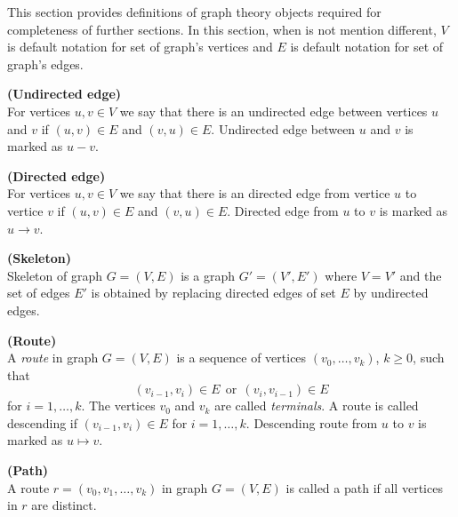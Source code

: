 %
%


This section provides definitions of graph theory objects required for completeness of further sections.
In this section, when is not mention different, $V$ is default notation for set of graph's vertices and 
$E$ is default notation for set of graph's edges. 


\begin{defi}{\textbf{(Undirected edge)}} \\
	For vertices $u, v \in V$ we say that there is an undirected edge between vertices $u$ 
	and $v$ if $(u, v) \in E$ and $(v, u) \in E$. Undirected edge between $u$ and $v$ is marked as $u-v$.
\end{defi}


\begin{defi} {\textbf{(Directed edge)}} \\
	For vertices $u, v \in V$ we say that there is an directed edge from vertice $u$ to vertice $v$ if
	$(u, v) \in E$ and $(v, u) \in E$. Directed edge from $u$ to $v$ is marked as $u \rightarrow v$.
\end{defi}


\begin{defi} {\textbf{(Skeleton)}} \\
	Skeleton of graph $G = (V, E)$ is a graph $G' = (V', E')$ where $V = V'$ and the set of edges $E'$
	is obtained by replacing directed edges of set $E$ by undirected edges.
\end{defi}


\begin{defi} {\textbf{(Route)}} \\
	A \textit{route} in graph $G = (V, E)$ is a sequence of vertices $(v_0, \dots, v_k)$, $k \ge 0$, such that 
	$$ (v_{i-1}, v_i) \in E \ \  \mbox{or} \ \ (v_i, v_{i-1}) \in E$$
	for $i = 1, \dots, k$. The vertices $v_0$ and $v_k$ are called \textit{terminals}. A route is called descending
	if $(v_{i-1}, v_i) \in E$ for $i = 1, \dots, k$. Descending route from $u$ to $v$ is marked as $u \mapsto v$. 
\end{defi}


\begin{defi} {\textbf{(Path)}} \\
	A route $r = (v_0, v_1, \dots, v_k)$ in graph $G = (V, E)$ is called a path if all vertices in $r$ are distinct.
\end{defi}


